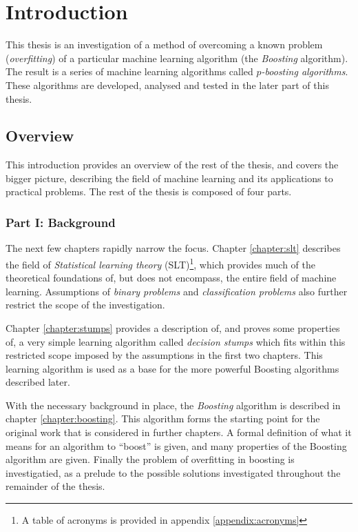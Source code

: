 
\chapter{Introduction}

This thesis is an investigation of a method of
overcoming a known problem (\emph{overfitting}) of a particular
machine learning algorithm (the \emph{Boosting} algorithm).  The
result is a series of machine learning algorithms called
\emph{$p$-boosting algorithms}.  These algorithms are developed,
analysed and tested in the later part of this thesis.


\section{Overview}

This introduction provides an overview of the rest of the thesis, and
covers the bigger picture, describing the field of machine learning
and its applications to practical problems.  The rest of the thesis is
composed of four parts.

\subsection*{Part I: Background}

The next few chapters rapidly narrow the focus.  Chapter
\ref{chapter:slt} describes the field of \emph{Statistical learning
theory} (SLT)\footnote{A table of acronyms is provided in appendix
\ref{appendix:acronyms}}, which provides much of the theoretical
foundations of, but does not encompass, the entire field of machine
learning.  Assumptions of \emph{binary problems} and
\emph{classification problems} also further restrict the scope of the
investigation.

Chapter \ref{chapter:stumps} provides a description of, and proves
some properties of, a very simple learning algorithm called
\emph{decision stumps} which fits within this restricted scope imposed
by the assumptions in the first two chapters.  This learning algorithm
is used as a base for the more powerful Boosting algorithms described
later.

With the necessary background in place, the \emph{Boosting} algorithm
is described in chapter \ref{chapter:boosting}.  This algorithm forms
the starting point for the original work that is considered in further
chapters.  A formal definition of what it means for an algorithm to
``boost'' is given, and many properties of the Boosting algorithm are
given.  Finally the problem of overfitting in boosting is
investigatied, as a prelude to the possible solutions investigated
throughout the remainder of the thesis.

